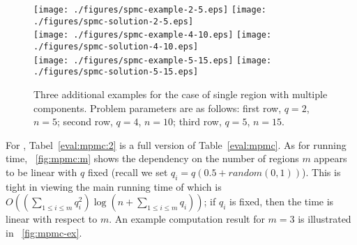 \begin{figure}[ht!]
    \centering
    \texttt{[image: ./figures/spmc-example-2-5.eps]}
    \texttt{[image: ./figures/spmc-solution-2-5.eps]}
    \vspace*{2mm} \\
    \texttt{[image: ./figures/spmc-example-4-10.eps]}
    \texttt{[image: ./figures/spmc-solution-4-10.eps]} \\
    \vspace*{2mm}
    \texttt{[image: ./figures/spmc-example-5-15.eps]}
    \hspace{5mm}
    \texttt{[image: ./figures/spmc-solution-5-15.eps]}
    \vspace*{-3mm}
    \caption[Three additional examples for the case of single region with multiple components]{\label{fig:opg-more-spmc-ex} Three additional examples for the 
		case of single region with multiple components. Problem parameters 
		are as follows: first row, $q = 2$, $n = 5$; second row, $q = 4$, 
		$n = 10$; third row, $q = 5$, $n = 15$.} 
    \vspace*{-4mm}
\end{figure}


For \algoMRG, Tabel~\ref{eval:mpmc:2} is a full version of 
Table~\ref{eval:mpmc}. As for running time, ~\ref{fig:mpmc:m} shows 
the dependency on the number of regions $m$ appears to be linear with 
$q$ fixed (recall we set $q_i = q(0.5 + random(0,1))$). This is tight
in viewing the main running time of \algoMRG which is 
$O((\sum_{1\le i \le m} q_i^2) \log(n + \sum_{1\le i \le m} q_i))$; if
$q_i$ is fixed, then the time is linear with respect to $m$. An example 
computation result for $m = 3$ is illustrated in ~\ref{fig:mpmc-ex}. 

